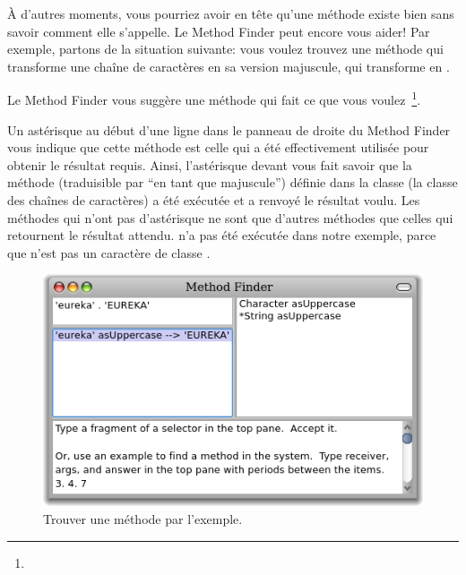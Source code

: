 \documentclass[a4paper,10pt,twoside]{book}
\begin{document}
À d'autres moments, vous pourriez avoir en tête qu'une méthode
existe bien sans savoir comment elle s'appelle.
Le Method Finder peut encore vous aider! Par exemple, partons de la
situation suivante: vous voulez trouvez une méthode qui transforme
une chaîne de caractères en sa version majuscule, \cad qui
transforme  en \mbox{.}

\noindent
Le Method Finder vous suggère une méthode qui fait ce
que vous voulez~\footnote{}.

Un astérisque au début d'une ligne dans le panneau de droite du
Method Finder vous indique que cette méthode est celle qui a été
effectivement utilisée pour obtenir le résultat requis.
Ainsi, l'astérisque devant  vous fait savoir
que la méthode  
(traduisible par ``en tant que majuscule'')
définie dans la classe  
(la classe des chaînes de caractères)
a été exécutée et a renvoyé le résultat voulu.
Les méthodes qui n'ont pas d'astérisque ne sont que d'autres
méthodes que celles qui retournent le résultat attendu.
 n'a pas été exécutée dans notre
exemple, parce que  n'est pas un caractère de classe .

\begin{figure}[hbt]
	{\centerline {\includegraphics[width=\textwidth]{MethodFinder-example1}}}
\caption{Trouver une méthode par l'exemple.
}
\end{figure}
\end{document}
